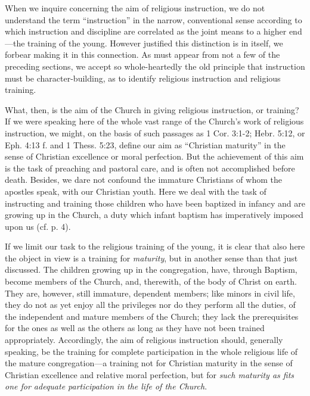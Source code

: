 When we inquire concerning the aim of religious instruction, we do not understand the term “instruction” in the narrow, conventional sense according to which instruction and discipline are correlated as the joint means to a higher end—the training of the young. However justified this distinction is in itself, we forbear making it in this connection. As must appear from not a few of the preceding sections, we accept so whole-heartedly the old principle that instruction must be character-building, as to identify religious instruction and religious training.

What, then, is the aim of the Church in giving religious instruction, or training? If we were speaking here of the whole vast range of the Church’s work of religious instruction, we might, on the basis of such passages as 1 Cor. 3:1-2; Hebr. 5:12, or Eph. 4:13 f. and 1 Thess. 5:23, define our aim as “Christian maturity” in the sense of Christian excellence or moral perfection. But the achievement of this aim is the task of preaching and pastoral care, and is often not accomplished before death. Besides, we dare not confound the immature Christians of whom the apostles speak, with our Christian youth. Here we deal with the task of instructing and training those children who have been baptized in infancy and are growing up in the Church, a duty which infant baptism has imperatively imposed upon us (cf. p. 4).

If we limit our task to the religious training of the young, it is clear that also here the object in view is a training for \emph{maturity}, but in another sense than that just discussed. The children growing up in the congregation, have, through Baptism, become members of the Church, and, therewith, of the body of Christ on earth. They are, however, still immature, dependent members; like minors in civil life, they do not as yet enjoy all the privileges nor do they perform all the duties, of the independent and mature members of the Church;
they lack the prerequisites for the ones as well as the others as long as they have not been trained appropriately. Accordingly, the aim of religious instruction should, generally speaking, be the training for complete participation in the whole religious life of the mature congregation—a training not for Christian maturity in the sense of Christian excellence and relative moral perfection, but for \emph{such maturity as fits one for adequate participation in the life of the Church}.

